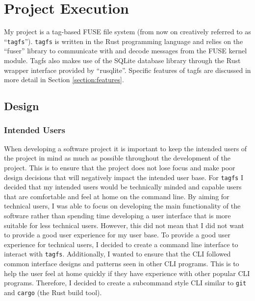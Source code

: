 \chapter{Project Execution}
\vspace{1cm}

My project is a tag-based FUSE file system (from now on creatively referred to
as ``\texttt{tagfs}''). \texttt{tagfs} is written in the Rust programming
language and relies on the ``fuser'' library to communicate with and decode
messages from the FUSE kernel module. Tagfs also makes use of the SQLite
database library through the Rust wrapper interface provided by ``rusqlite''.
Specific features of tagfs are discussed in more detail in Section
\ref{section:features}.

\section{Design}
\label{sec:design}

\subsection{Intended Users}

When developing a software project it is important to keep the intended users
of the project in mind as much as possible throughout the development of the
project. This is to ensure that the project does not lose focus and make poor
design decisions that will negatively impact the intended user base. For
\texttt{tagfs} I decided that my intended users would be technically
minded and capable users that are comfortable and feel at home on the command
line. By aiming for technical users, I was able to focus on developing the
main functionality of the software rather than spending time developing a user
interface that is more suitable for less technical users. However, this did not
mean that I did not want to provide a good user experience for my user base. To
provide a good user experience for technical users, I decided to create a
command line interface to interact with \texttt{tagfs}. Additionally, I wanted
to ensure that the CLI followed common interface designs and patterns seen in
other CLI programs. This is to help the user feel at home quickly if they have
experience with other popular CLI programs. Therefore, I decided to create a
subcommand style CLI similar to \texttt{git} and \texttt{cargo} (the Rust build
tool).


